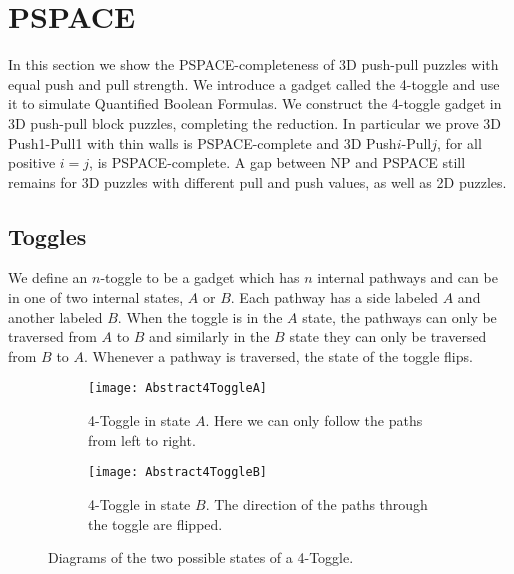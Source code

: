 \section{PSPACE}
\label{3DPSPACE}
In this section we show the PSPACE-completeness of 3D push-pull puzzles with equal push and pull strength. We introduce a gadget called the 4-toggle and use it to simulate Quantified Boolean Formulas\cite{NPBook}. We construct the 4-toggle gadget in 3D push-pull block puzzles, completing the reduction. In particular we prove 3D Push1-Pull1 with thin walls is PSPACE-complete and 3D Push$i$-Pull$j$, for all positive $i=j$, is PSPACE-complete. A gap between NP and PSPACE still remains for 3D puzzles with different pull and push values, as well as 2D puzzles. 


\subsection{Toggles}
We define an $n$-toggle to be a gadget which has $n$ internal pathways and can be in one of two internal states, $A$ or $B$. Each pathway has a side labeled $A$ and another labeled $B$. When the toggle is in the $A$ state, the pathways can only be traversed from $A$ to $B$ and similarly in the $B$ state they can only be traversed from $B$ to $A$. Whenever a pathway is traversed, the state of the toggle flips.

\begin{figure}[!ht]
\centering
\begin{subfigure}[t]{0.45\textwidth}
  \centering
    \texttt{[image: Abstract4ToggleA]}
    \caption{4-Toggle in state $A$. Here we can only follow the paths from left to right.}
    \label{fig:Abstract4ToggleA}
\end{subfigure}
\begin{subfigure}[t]{0.45\textwidth}
  \centering
    \texttt{[image: Abstract4ToggleB]}
    \caption{4-Toggle in state $B$. The direction of the paths through the toggle are flipped.}
    \label{fig:Abstract4ToggleB}
\end{subfigure}
\caption{Diagrams of the two possible states of a 4-Toggle.}
\end{figure}

